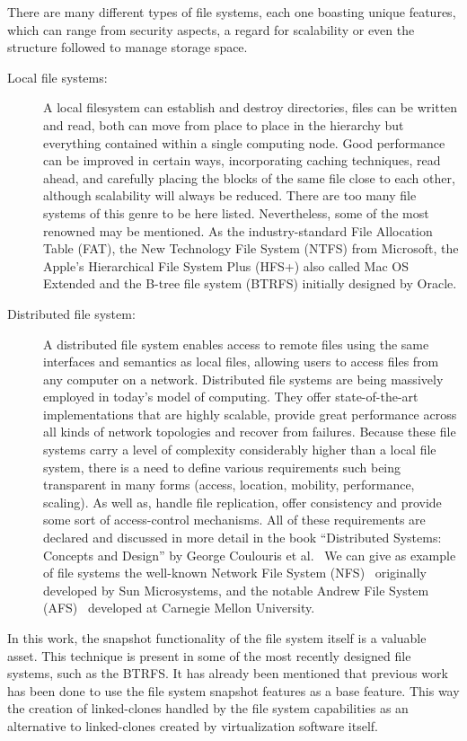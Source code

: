 There are many different types of file systems, each one boasting unique features, which can range from security aspects, a regard for scalability or even the structure followed to manage storage space.

\begin{description}
	\item [Local file systems:] A local filesystem can establish and destroy directories, files can be written and read, both can move from place to place in the hierarchy but everything contained within a single computing node. 
Good performance can be improved in certain ways, incorporating caching techniques, read ahead, and carefully placing the blocks of the same file close to each other, although scalability will always be reduced. 
There are too many file systems of this genre to be here listed. Nevertheless, some of the most renowned may be mentioned. As the industry-standard File Allocation Table (FAT), the New Technology File System (NTFS) from Microsoft, the Apple's Hierarchical File System Plus (HFS+) also called Mac OS Extended and the B-tree file system (BTRFS) initially designed by Oracle.
	\item [Distributed file system:] A distributed file system enables access to remote files using the same interfaces and semantics as local files, allowing users to access files from any computer on a network. 
	Distributed file systems are being massively employed in today's model of computing. They offer state-of-the-art implementations that are highly scalable, provide great performance across all kinds of network topologies and recover from failures. 
	Because these file systems carry a level of complexity considerably higher than a local file system, there is a need to define various requirements such being transparent in many forms (access, location, mobility, performance, scaling). As well as, handle file replication, offer consistency and provide some sort of access-control mechanisms. 
	All of these requirements are declared and discussed in more detail in the book \enquote{Distributed Systems: Concepts and Design} by George Coulouris et al.~\cite{Coulouris2011}
	We can give as example of file systems the well-known Network File System (NFS)~\cite{rfc5661} originally developed by Sun Microsystems, and the notable Andrew File System (AFS)~\cite{Satyanarayanan1990} developed at Carnegie Mellon University.
\end{description}


In this work, the snapshot functionality of the file system itself is a valuable asset. This technique is present in some of the most recently designed file systems, such as the BTRFS. It has already been mentioned that previous work has been done to use the file system snapshot features as a base feature. This way the creation of linked-clones handled by the file system capabilities as an alternative to linked-clones created by virtualization software itself.


